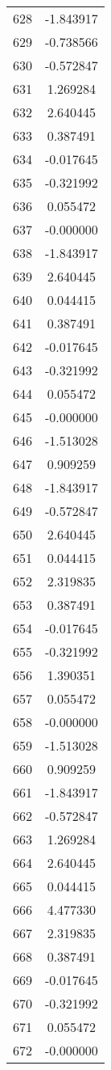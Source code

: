 \documentclass[12pt]{article}
\begin{document}
\begin{longtable}{@{}cc@{}}
628 & -1.843917 \\
629 & -0.738566 \\
630 & -0.572847 \\
631 & 1.269284 \\
632 & 2.640445 \\
633 & 0.387491 \\
634 & -0.017645 \\
635 & -0.321992 \\
636 & 0.055472 \\
637 & -0.000000 \\
638 & -1.843917 \\
639 & 2.640445 \\
640 & 0.044415 \\
641 & 0.387491 \\
642 & -0.017645 \\
643 & -0.321992 \\
644 & 0.055472 \\
645 & -0.000000 \\
646 & -1.513028 \\
647 & 0.909259 \\
648 & -1.843917 \\
649 & -0.572847 \\
650 & 2.640445 \\
651 & 0.044415 \\
652 & 2.319835 \\
653 & 0.387491 \\
654 & -0.017645 \\
655 & -0.321992 \\
656 & 1.390351 \\
657 & 0.055472 \\
658 & -0.000000 \\
659 & -1.513028 \\
660 & 0.909259 \\
661 & -1.843917 \\
662 & -0.572847 \\
663 & 1.269284 \\
664 & 2.640445 \\
665 & 0.044415 \\
666 & 4.477330 \\
667 & 2.319835 \\
668 & 0.387491 \\
669 & -0.017645 \\
670 & -0.321992 \\
671 & 0.055472 \\
672 & -0.000000 \\

\end{longtable}
\end{document}

